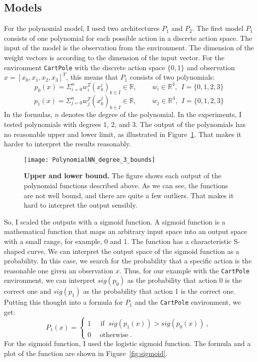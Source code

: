 \subsection{Models}
\label{ssec:models}
For the polynomial model, I used two architectures $P_1$ and $P_2$. The first model $P_1$ consists of one polynomial for each possible action in a discrete action space. The input of the model is the observation from the environment. The dimension of the weight vectors is according to the dimension of the input vector. For the environment \verb|CartPole| with the discrete action space $\{0, 1\}$ and observation $x = [x_0, x_1, x_2, x_3]^T$, this means that $P_1$ consists of two polynomials:
\[
  p_0(x) = \Sigma_{i=0}^{n} w_i^T (x_k^i)_{k \in I} \in \mathbb{R}, \ \ \ \ \ \ \ \ \ \ w_i \in \mathbb{R}^4, \ \ I = \{0, 1, 2, 3\}
\]
\[
  p_1(x) = \Sigma_{j=0}^{n} w_j^T (x_k^j)_{k \in I} \in \mathbb{R}, \ \ \ \ \ \ \ \ \ \ w_j \in \mathbb{R}^4, \ \ I = \{0, 1, 2, 3\}
\]
In the formulas, $n$ denotes the degree of the polynomial. In the experiments, I tested polynomials with degrees 1, 2, and 3. The output of the polynomials has no reasonable upper and lower limit, as illustrated in Figure~\ref{fig:bounds}. That makes it harder to interpret the results reasonably.
\begin{figure}[ht]
\centering
\texttt{[image: PolynomialNN\_degree\_3\_bounds]}
\caption[Upper and lower bound]{
  \textbf{Upper and lower bound.}
  The figure shows each output of the polynomial functions described above. As we can see, the functions are not well bound, and there are quite a few outliers. That makes it hard to interpret the output sensibly.
}
\label{fig:bounds}
\end{figure}
So, I scaled the outputs with a sigmoid function. A sigmoid function is a mathematical function that maps an arbitrary input space into an output space with a small range, for example, 0 and 1. The function has a characteristic S-shaped curve. We can interpret the output space of the sigmoid function as a probability. In this case, we search for the probability that a specific action is the reasonable one given an observation $x$. Thus, for our example with the \verb|CartPole| environment, we can interpret $sig(p_0)$ as the probability that action 0 is the correct one and $sig(p_1)$ as the probability that action 1 is the correct one. Putting this thought into a formula for $P_1$ and the \verb|CartPole| environment, we get:
\[
  P_1(x) =
  \begin{cases}1~&{\text{ if }}~sig(p_1(x)) > sig(p_0(x))~,\\0~&~\text{otherwise}~.\end{cases}
\]
For the sigmoid function, I used the logistic sigmoid function. The formula and a plot of the function are shown in Figure~\ref{fig:sigmoid}.

